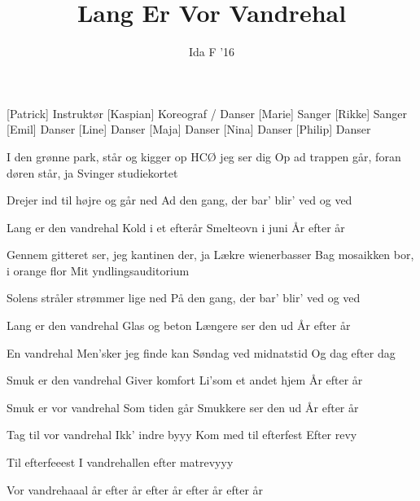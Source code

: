\documentclass[a4paper,11pt]{article}
\title{Lang Er Vor Vandrehal}
\author{Ida F '16}
\begin{document}
\maketitle

\begin{roles}
[Patrick] Instruktør
[Kaspian] Koreograf / Danser
[Marie] Sanger
[Rikke] Sanger
[Emil] Danser
[Line] Danser
[Maja] Danser
[Nina] Danser
[Philip] Danser
\end{roles}

\begin{song}
 I den grønne park, står og kigger op
HCØ jeg ser dig
Op ad trappen går, foran døren står, ja
Svinger studiekortet

Drejer ind til højre og går ned
Ad den gang, der bar' blir' ved og ved

 Lang er den vandrehal
Kold i et efterår
Smelteovn i juni
År efter år

 Gennem gitteret ser, jeg kantinen der, ja
Lækre wienerbasser
Bag mosaikken bor, i orange flor
Mit yndlingsauditorium

Solens stråler strømmer lige ned
På den gang, der bar' blir' ved og ved

 Lang er den vandrehal
Glas og beton
Længere ser den ud
År efter år

En vandrehal
Men'sker jeg finde kan
Søndag ved midnatstid
Og dag efter dag

 Smuk er den vandrehal
 Giver komfort
 Li'som et andet hjem
 År efter år

 Smuk er vor vandrehal
Som tiden går
Smukkere ser den ud
År efter år

 Tag til vor vandrehal
Ikk' indre byyy
Kom med til efterfest 
Efter revy

Til efterfeeest
I vandrehallen efter matrevyyy

 Vor vandrehaaal
år efter år efter år efter år efter år
\end{song}
\end{document}
